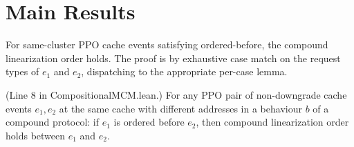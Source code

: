 \section{Main Results}
\label{sec:main-theorem}

\begin{lemma}
  \label{lem:ppo_cluster_events}
  \leanok
  For same-cluster PPO cache events satisfying ordered-before,
  the compound linearization order holds.
  The proof is by exhaustive case match on the request types of $e_1$ and $e_2$,
  dispatching to the appropriate per-case lemma.
\end{lemma}

\begin{theorem}
  \label{thm:enforce_compound_consistency}
  \leanok
  (Line 8 in CompositionalMCM.lean.)
  For any PPO pair of non-downgrade cache events $e_1, e_2$ at the same cache
  with different addresses in a behaviour $b$ of a compound protocol:
  if $e_1$ is ordered before $e_2$, then compound linearization order holds
  between $e_1$ and $e_2$.
\end{theorem}
